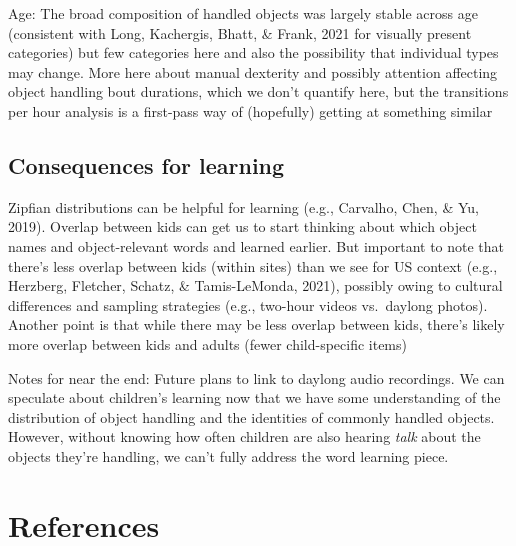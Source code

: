 \documentclass[10pt, letterpaper]{article}
\begin{document}
Age: The broad composition of handled objects was largely stable across
age (consistent with Long, Kachergis, Bhatt, \& Frank, 2021 for visually
present categories) but few categories here and also the possibility
that individual types may change. More here about manual dexterity and
possibly attention affecting object handling bout durations, which we
don't quantify here, but the transitions per hour analysis is a
first-pass way of (hopefully) getting at something similar

\hypertarget{consequences-for-learning}{%
\subsection{Consequences for learning}\label{consequences-for-learning}}

Zipfian distributions can be helpful for learning (e.g., Carvalho, Chen,
\& Yu, 2019). Overlap between kids can get us to start thinking about
which object names and object-relevant words and learned earlier. But
important to note that there's less overlap between kids (within sites)
than we see for US context (e.g., Herzberg, Fletcher, Schatz, \&
Tamis-LeMonda, 2021), possibly owing to cultural differences and
sampling strategies (e.g., two-hour videos vs.~daylong photos). Another
point is that while there may be less overlap between kids, there's
likely more overlap between kids and adults (fewer child-specific items)

Notes for near the end: Future plans to link to daylong audio
recordings. We can speculate about children's learning now that we have
some understanding of the distribution of object handling and the
identities of commonly handled objects. However, without knowing how
often children are also hearing \emph{talk} about the objects they're
handling, we can't fully address the word learning piece.

\hypertarget{references}{%
\section{References}\label{references}}

\setlength{\parindent}{-0.1in} 
\setlength{\leftskip}{0.125in}

\noindent
\end{document}
